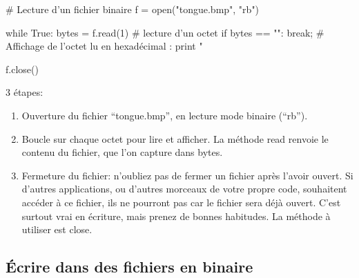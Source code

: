 \documentclass[10pt,fleqn]{article} %
\begin{document}
\begin{minipage}[c]{.49\linewidth}

\begin{py}
\begin{python}[h]
# Lecture d'un fichier binaire
f = open("tongue.bmp", "rb")

while True:
	bytes = f.read(1) # lecture d'un octet
	if bytes == "":
	    break;
	# Affichage de l'octet lu en hexadécimal :
	print "%

f.close()
\end{python}
\end{py}



\end{minipage} \hfill
\begin{minipage}[c]{.49\linewidth}
3 étapes:
\begin{enumerate}
\item Ouverture du fichier “tongue.bmp”, en lecture mode binaire (“rb”).
\item Boucle sur chaque octet pour lire et afficher. La méthode read renvoie le contenu du fichier, que l'on capture dans bytes.
\item Fermeture du fichier: n'oubliez pas de fermer un fichier après l'avoir ouvert. Si d'autres applications, ou d'autres morceaux de votre propre code, souhaitent accéder à ce fichier, ils ne pourront pas car le fichier sera déjà ouvert. C'est surtout vrai en écriture, mais prenez de bonnes habitudes. La méthode à utiliser est \textsf{close}.
\end{enumerate} 
\end{minipage}


\subsection{Écrire dans des fichiers en binaire}
\end{document}
